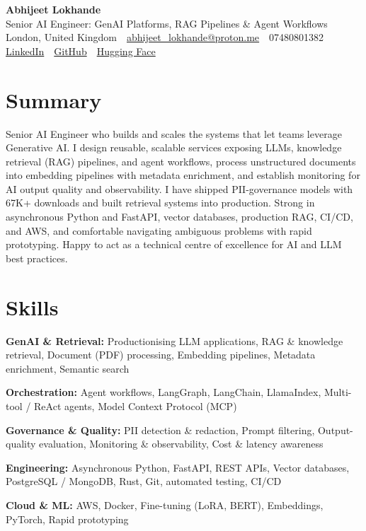 \documentclass[10pt,a4paper]{article}
\newcommand{\sep}{\,\textcolor{accent!60}{\textbar}\,}
\begin{document}
\begin{center}
  {\fontsize{24}{26}\selectfont\bfseries Abhijeet Lokhande}\\[3pt]
  {\color{accent}\large Senior AI Engineer: GenAI Platforms, RAG Pipelines \& Agent Workflows}\\[5pt]
  {\small
    London, United Kingdom \sep
    \href{mailto:abhijeet_lokhande@proton.me}{abhijeet\_lokhande@proton.me} \sep
    07480801382 \\[2pt]
    \href{https://www.linkedin.com/in/ablds/}{LinkedIn} \sep
    \href{https://github.com/abhijeetscode}{GitHub} \sep
    \href{https://huggingface.co/ab-ai}{Hugging Face}
  }
\end{center}
\vspace{2pt}

\section{Summary}
Senior AI Engineer who builds and scales the systems that let teams leverage Generative AI. I design reusable, scalable services exposing LLMs, knowledge retrieval (RAG) pipelines, and agent workflows, process unstructured documents into embedding pipelines with metadata enrichment, and establish monitoring for AI output quality and observability. I have shipped PII-governance models with 67K+ downloads and built retrieval systems into production. Strong in asynchronous Python and FastAPI, vector databases, production RAG, CI/CD, and AWS, and comfortable navigating ambiguous problems with rapid prototyping. Happy to act as a technical centre of excellence for AI and LLM best practices.

\section{Skills}
\begin{tight}
  \item[\textcolor{accent}{\small$\bullet$}] \textbf{GenAI \& Retrieval:} Productionising LLM applications, RAG \& knowledge retrieval, Document (PDF) processing, Embedding pipelines, Metadata enrichment, Semantic search
  \item[\textcolor{accent}{\small$\bullet$}] \textbf{Orchestration:} Agent workflows, LangGraph, LangChain, LlamaIndex, Multi-tool / ReAct agents, Model Context Protocol (MCP)
  \item[\textcolor{accent}{\small$\bullet$}] \textbf{Governance \& Quality:} PII detection \& redaction, Prompt filtering, Output-quality evaluation, Monitoring \& observability, Cost \& latency awareness
  \item[\textcolor{accent}{\small$\bullet$}] \textbf{Engineering:} Asynchronous Python, FastAPI, REST APIs, Vector databases, PostgreSQL / MongoDB, Rust, Git, automated testing, CI/CD
  \item[\textcolor{accent}{\small$\bullet$}] \textbf{Cloud \& ML:} AWS, Docker, Fine-tuning (LoRA, BERT), Embeddings, PyTorch, Rapid prototyping
\end{tight}
\end{document}
